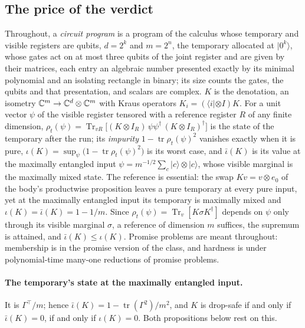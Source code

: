 \documentclass[acmsmall,screen,review,anonymous,nonacm]{acmart}
\begin{document}
\subsection{The price of the verdict}\label{app:cost}

Throughout, a \emph{circuit program} is a program of the calculus whose
temporary and visible registers are qubits, $d = 2^{k}$ and $m = 2^{n}$, the
temporary allocated at $|0^{k}\rangle$, whose gates act on at most three
qubits of the joint register and are given by their matrices, each entry an algebraic number presented exactly by its minimal polynomial and an isolating rectangle in binary; its size counts the gates, the qubits and that presentation, and scalars are complex. $K$ is the denotation, an isometry $\mathbb{C}^{m} \to \mathbb{C}^{d}
\otimes \mathbb{C}^{m}$ with Kraus operators $K_i = (\langle i| \otimes I)K$. For a
unit vector $\psi$ of the visible register tensored with a reference register
$R$ of any finite dimension, $\rho_t(\psi) = \operatorname{Tr}_{vR}\bigl[(K
\otimes I_R)\,\psi\psi^{\dagger}\,(K \otimes I_R)^{\dagger}\bigr]$ is the state
of the temporary after the run; its \emph{impurity} $1 -
\operatorname{tr}\rho_t(\psi)^{2}$ vanishes exactly when it is pure, $\iota(K)
= \sup_{\psi}\bigl(1 - \operatorname{tr}\rho_t(\psi)^{2}\bigr)$ is its worst
case, and $\bar\iota(K)$ is its value at the maximally entangled input $\psi
= m^{-1/2}\sum_c |c\rangle \otimes |c\rangle$, whose visible marginal is the
maximally mixed state. The reference is essential: the swap $Kv = v \otimes
e_0$ of the body's productwise proposition leaves a pure temporary at every
pure input, yet at the maximally entangled input its temporary is maximally
mixed and $\iota(K) = \bar\iota(K) = 1 - 1/m$. Since $\rho_t(\psi) = \operatorname{Tr}_v[K
\sigma K^{\dagger}]$ depends on $\psi$ only through its visible marginal
$\sigma$, a reference of dimension $m$ suffices, the supremum is attained,
and $\bar\iota(K) \le \iota(K)$. Promise problems are meant throughout:
membership is in the promise version of the class, and hardness is under
polynomial-time many-one reductions of promise problems.

\paragraph{The temporary's state at the maximally entangled input.} It is
$\Gamma^{\top}/m$; hence $\bar\iota(K) = 1 -
\operatorname{tr}(\Gamma^{2})/m^{2}$, and $K$ is drop-safe if and only if
$\bar\iota(K) = 0$, if and only if $\iota(K) = 0$. Both propositions below
rest on this.
\end{document}
